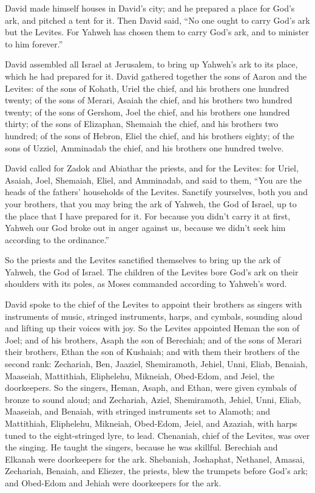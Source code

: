  David made himself houses in David's city; and he prepared
a place for God's ark, and pitched a tent for it.  Then
David said, ``No one ought to carry God's ark but the Levites. For
Yahweh has chosen them to carry God's ark, and to minister to him
forever.''

 David assembled all Israel at Jerusalem, to bring up
Yahweh's ark to its place, which he had prepared for it. 
David gathered together the sons of Aaron and the Levites: 
of the sons of Kohath, Uriel the chief, and his brothers one hundred
twenty;  of the sons of Merari, Asaiah the chief, and his
brothers two hundred twenty;  of the sons of Gershom, Joel
the chief, and his brothers one hundred thirty;  of the sons
of Elizaphan, Shemaiah the chief, and his brothers two hundred;
 of the sons of Hebron, Eliel the chief, and his brothers
eighty;  of the sons of Uzziel, Amminadab the chief, and
his brothers one hundred twelve.

 David called for Zadok and Abiathar the priests, and for
the Levites: for Uriel, Asaiah, Joel, Shemaiah, Eliel, and Amminadab,
 and said to them, ``You are the heads of the fathers'
households of the Levites. Sanctify yourselves, both you and your
brothers, that you may bring the ark of Yahweh, the God of Israel, up to
the place that I have prepared for it.  For because you
didn't carry it at first, Yahweh our God broke out in anger against us,
because we didn't seek him according to the ordinance.''

 So the priests and the Levites sanctified themselves to
bring up the ark of Yahweh, the God of Israel.  The
children of the Levites bore God's ark on their shoulders with its
poles, as Moses commanded according to Yahweh's word.

 David spoke to the chief of the Levites to appoint their
brothers as singers with instruments of music, stringed instruments,
harps, and cymbals, sounding aloud and lifting up their voices with joy.
 So the Levites appointed Heman the son of Joel; and of his
brothers, Asaph the son of Berechiah; and of the sons of Merari their
brothers, Ethan the son of Kushaiah;  and with them their
brothers of the second rank: Zechariah, Ben, Jaaziel, Shemiramoth,
Jehiel, Unni, Eliab, Benaiah, Maaseiah, Mattithiah, Eliphelehu,
Mikneiah, Obed-Edom, and Jeiel, the doorkeepers.  So the
singers, Heman, Asaph, and Ethan, were given cymbals of bronze to sound
aloud;  and Zechariah, Aziel, Shemiramoth, Jehiel, Unni,
Eliab, Maaseiah, and Benaiah, with stringed instruments set to Alamoth;
 and Mattithiah, Eliphelehu, Mikneiah, Obed-Edom, Jeiel,
and Azaziah, with harps tuned to the eight-stringed lyre, to lead.
 Chenaniah, chief of the Levites, was over the singing. He
taught the singers, because he was skillful.  Berechiah and
Elkanah were doorkeepers for the ark.  Shebaniah,
Joshaphat, Nethanel, Amasai, Zechariah, Benaiah, and Eliezer, the
priests, blew the trumpets before God's ark; and Obed-Edom and Jehiah
were doorkeepers for the ark.


